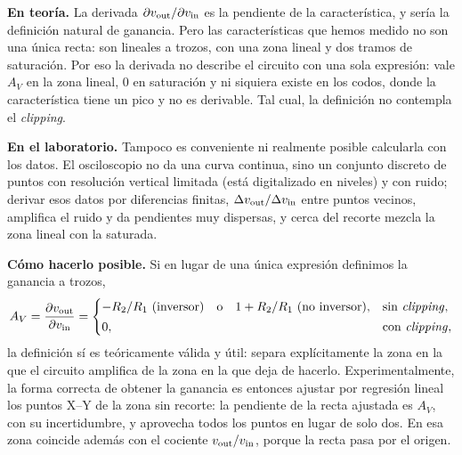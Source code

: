 \begin{respuesta}
\textbf{En teoría.} La derivada $\partial v_{\mathrm{out}}/\partial v_{\mathrm{in}}$ es la pendiente de la característica, y sería la
definición natural de ganancia. Pero las características que hemos medido no son una única recta: son
lineales a trozos, con una zona lineal y dos tramos de saturación. Por eso la derivada no describe el
circuito con una sola expresión: vale $A_V$ en la zona lineal, $0$ en saturación y ni siquiera existe en los
codos, donde la característica tiene un pico y no es derivable. Tal cual, la definición no contempla el
\emph{clipping}.

\textbf{En el laboratorio.} Tampoco es conveniente ni realmente posible calcularla con los datos. El
osciloscopio no da una curva continua, sino un conjunto discreto de puntos con resolución vertical limitada
(está digitalizado en niveles) y con ruido; derivar esos datos por diferencias finitas,
$\Delta v_{\mathrm{out}}/\Delta v_{\mathrm{in}}$ entre puntos vecinos, amplifica el ruido y da pendientes muy dispersas, y cerca del
recorte mezcla la zona lineal con la saturada.

\textbf{Cómo hacerlo posible.} Si en lugar de una única expresión definimos la ganancia a trozos,
\begin{equation}\label{eq:n-deriv}
  A_V=\frac{\partial v_{\mathrm{out}}}{\partial v_{\mathrm{in}}}=
  \begin{cases}
    -R_2/R_1 \ \text{(inversor)}\quad\text{o}\quad 1+R_2/R_1 \ \text{(no inversor)}, & \text{sin \emph{clipping}},\\[2pt]
    0, & \text{con \emph{clipping}},
  \end{cases}
\end{equation}
la definición sí es teóricamente válida y útil: separa explícitamente la zona en la que el circuito
amplifica de la zona en la que deja de hacerlo. Experimentalmente, la forma correcta de obtener la ganancia
es entonces ajustar por regresión lineal los puntos X--Y de la zona sin recorte: la pendiente de la recta
ajustada es $A_V$, con su incertidumbre, y aprovecha todos los puntos en lugar de solo dos. En esa zona
coincide además con el cociente $v_{\mathrm{out}}/v_{\mathrm{in}}$, porque la recta pasa por el origen.
\end{respuesta}
